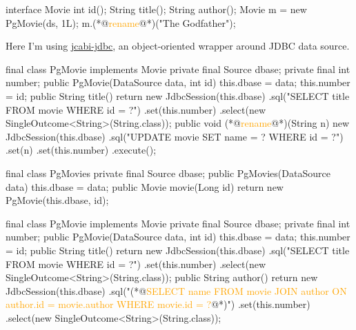 \documentclass{article}
\begin{document}
\begin{pptWide}{2}
{\small\begin{ffcode}
interface Movie {
  int id();
  String title();
  String author();
}
Movie m = new PgMovie(ds, 1L);
m.(*@\textcolor{orange}{rename}@*)("The Godfather");
\end{ffcode}
}
\par
Here I'm using \href{https://github.com/jcabi/jcabi-jdbc}{jcabi-jdbc},
an object-oriented wrapper around JDBC data source.
\par\columnbreak\par
{\scriptsize\begin{ffcode}
final class PgMovie implements Movie
  private final Source dbase;
  private final int number;
  public PgMovie(DataSource data, int id)
    this.dbase = data;
    this.number = id;
  public String title()
    return new JdbcSession(this.dbase)
      .sql("SELECT title FROM movie WHERE id = ?")
      .set(this.number)
      .select(new SingleOutcome<String>(String.class));
  public void (*@\textcolor{orange}{rename}@*)(String n)
    new JdbcSession(this.dbase)
      .sql("UPDATE movie SET name = ? WHERE id = ?")
      .set(n)
      .set(this.number)
      .execute();
\end{ffcode}
}
\end{pptWide}
\par
\plush{}

\begin{pptWide}{2}
{\small\begin{ffcode}
final class PgMovies
  private final Source dbase;
  public PgMovies(DataSource data)
    this.dbase = data;
  public Movie movie(Long id)
    return new PgMovie(this.dbase, id);
\end{ffcode}
}
\par\columnbreak\par
{\scriptsize\begin{ffcode}
final class PgMovie implements Movie
  private final Source dbase;
  private final int number;
  public PgMovie(DataSource data, int id)
    this.dbase = data;
    this.number = id;
  public String title()
    return new JdbcSession(this.dbase)
      .sql("SELECT title FROM movie WHERE id = ?")
      .set(this.number)
      .select(new SingleOutcome<String>(String.class));
  public String author()
    return new JdbcSession(this.dbase)
      .sql("(*@\textcolor{orange}{SELECT name FROM movie JOIN author ON author.id = movie.author WHERE movie.id = ?}@*)")
      .set(this.number)
      .select(new SingleOutcome<String>(String.class));
\end{ffcode}
}
\end{pptWide}
\plush{}
\end{document}
